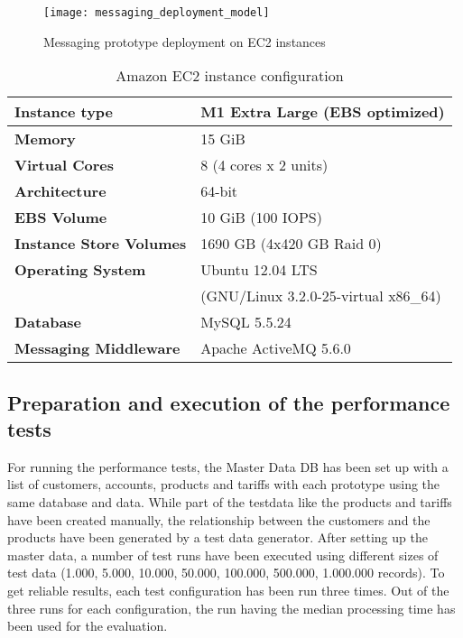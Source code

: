 \begin{figure}[htbp]
	\centering
	\texttt{[image: messaging\_deployment\_model]}
	\caption{Messaging prototype deployment on EC2 instances}
	\label{fig:ch4_messaging_deployment_model}
\end{figure}

\begin{table}[htbp]
	\centering
	\begin{tabularx}{\textwidth}{@{} l X @{}}
		\caption{Amazon EC2 instance configuration} \label{table:ch4_amazon_ec2} \\
		\toprule
		\bfseries Instance type & M1 Extra Large (EBS optimized)\\
		\midrule
		\bfseries Memory & 15 GiB\\
		\midrule
		\bfseries Virtual Cores & 8 (4 cores x 2 units)\\
		\midrule
		\bfseries Architecture & 64-bit\\
		\midrule
		\bfseries EBS Volume & 10 GiB (100 IOPS)\\
		\midrule
		\bfseries Instance Store Volumes & 1690 GB (4x420 GB Raid 0)\\
		\midrule
		\bfseries Operating System & Ubuntu 12.04 LTS\\
		& (GNU/Linux 3.2.0-25-virtual x86\_64)\\
		\midrule 
		\bfseries Database & MySQL 5.5.24\\
		\midrule
		\bfseries Messaging Middleware & Apache ActiveMQ 5.6.0\\
		\bottomrule
	\end{tabularx}
\end{table}

\subsection{Preparation and execution of the performance tests}
For running the performance tests, the Master Data DB has been set up with a list of customers, accounts, products and tariffs with each prototype using the same database and data. While part of the testdata like the products and tariffs have been created manually, the relationship between the customers and the products have been generated by a test data generator.
\newpage
After setting up the master data, a number of test runs have been executed using different sizes of test data (1.000, 5.000, 10.000, 50.000, 100.000, 500.000, 1.000.000 records). To get reliable results, each test configuration has been run three times. Out of the three runs for each configuration, the run having the median processing time has been used for the evaluation.

